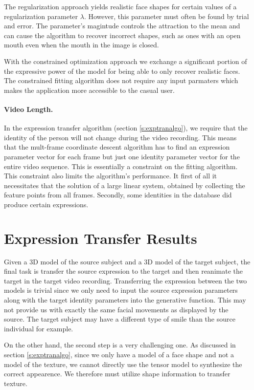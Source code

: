 \documentclass[11pt,a4paper,twoside]{report}
\begin{document}
The regularization approach yields realistic face
shapes for certain values of a regularization parameter $\lambda$. However, this
parameter must often be found by trial and error. The parameter's magintude
controls the attraction to the mean and can cause the algorithm to recover
incorrect shapes, such as ones with an open mouth even when the mouth in the
image is closed.

With the constrained optimization approach we exchange a significant portion of
the expressive power of the model for being able to only recover realistic
faces. The constrained fitting algorithm does not require any input parmaters
which makes the application more accessible to the casual user.

\paragraph{Video Length.}
In the expression transfer algorithm (section \ref{s:exptranalgo}), we require
that the identity of the person will not change during the video recording. This
means that the mult-frame coordinate descent algorithm has to find an expression
parameter vector for each frame but just one identity parameter vector for the
entire video sequence. This is essentially a constraint on the fitting
algorithm. This constraint also limits the algorithm's performance. It first of all
it necessitates that the solution of a large linear system, obtained by
collecting the feature points from all frames. Secondly, some identities in the database did produce certain expressions. 


\section{Expression Transfer Results}
Given a 3D model of the source subject and a 3D model of the target subject, the
final task is transfer the source expression to the target and then reanimate
the target in the target video recording. Transferring the expression between
the two models is trivial since we only need to input the source expression
parameters along with the target identity parameters into the generative
function. This may not provide us with exactly the same facial movements as
displayed by the source. The target subject may have a different type of smile
than the source individual for example.

On the other hand, the second step is a very challenging one. As discussed in section
\ref{s:exptranalgo}, since we only have a model of a face shape and not a model
of the texture, we cannot directly use the tensor model to synthesize the
correct appearence. We therefore must utilize shape information to transfer
texture. 
\end{document}

